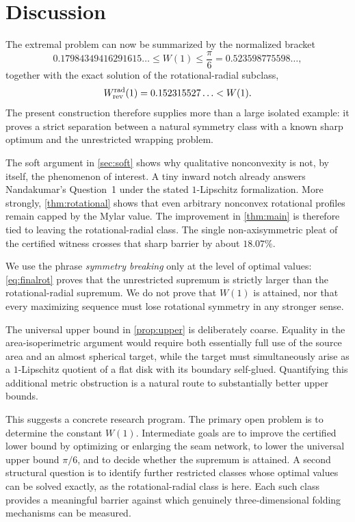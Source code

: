 \section{Discussion}
The extremal problem can now be summarized by the normalized bracket
\begin{equation}\label{eq:finalbracket}
0.17984349416291615\ldots
\le W(1)
\le\frac{\pi}{6}
=0.523598775598\ldots,
\end{equation}
together with the exact solution of the rotational-radial subclass,
\begin{equation}\label{eq:finalrot}
W_{\rm rev}^{\rm rad}(1)
=0.152315527\ldots
<W(1).
\end{equation}
The present construction therefore supplies more than a large isolated example: it proves a strict separation between a natural symmetry class with a known sharp optimum and the unrestricted wrapping problem.

The soft argument in \cref{sec:soft} shows why qualitative nonconvexity is not, by itself, the phenomenon of interest.  A tiny inward notch already answers Nandakumar's Question~1 under the stated $1$-Lipschitz formalization.  More strongly, \cref{thm:rotational} shows that even arbitrary nonconvex rotational profiles remain capped by the Mylar value.  The improvement in \cref{thm:main} is therefore tied to leaving the rotational-radial class.  The single non-axisymmetric pleat of the certified witness crosses that sharp barrier by about $18.07\%$.

We use the phrase \emph{symmetry breaking} only at the level of optimal values: \eqref{eq:finalrot} proves that the unrestricted supremum is strictly larger than the rotational-radial supremum.  We do not prove that $W(1)$ is attained, nor that every maximizing sequence must lose rotational symmetry in any stronger sense.

The universal upper bound in \cref{prop:upper} is deliberately coarse.  Equality in the area-isoperimetric argument would require both essentially full use of the source area and an almost spherical target, while the target must simultaneously arise as a $1$-Lipschitz quotient of a flat disk with its boundary self-glued.  Quantifying this additional metric obstruction is a natural route to substantially better upper bounds.

This suggests a concrete research program.  The primary open problem is to determine the constant $W(1)$.  Intermediate goals are to improve the certified lower bound by optimizing or enlarging the seam network, to lower the universal upper bound $\pi/6$, and to decide whether the supremum is attained.  A second structural question is to identify further restricted classes whose optimal values can be solved exactly, as the rotational-radial class is here.  Each such class provides a meaningful barrier against which genuinely three-dimensional folding mechanisms can be measured.

